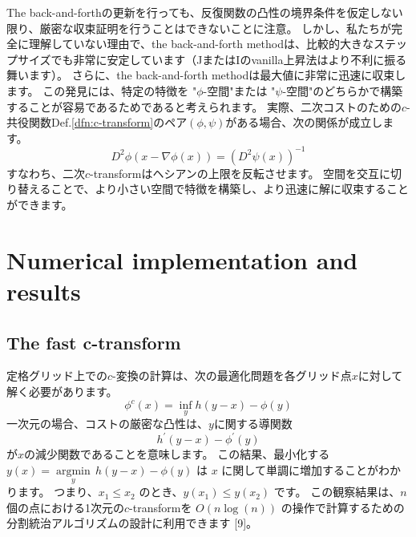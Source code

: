 \documentclass{jsarticle}
\theoremstyle{definition}
\begin{document}
\begin{comment}
  Proposition 2の簡単な証明を以下に示します。

  1. 全ての反復$\varphi_n$、$\varphi_{n+1/2}$、$\psi_n$、$\psi_{n+1/2}$が関数集合$S_{\lambda}=\{\varphi:(1-\lambda^{-1})I\leq D^2\varphi(x)\leq(1-\lambda)I\}$に属すると仮定します。
  2. 反復の定義を使用して、$\varphi_{n+1}$と$\psi_{n+1}$を$\varphi_n$、$\varphi_{n+1/2}$、$\psi_n$、$\psi_{n+1/2}$の式で表します。
  3. 関数集合$S_{\lambda}$に関する仮定を使用して、$\varphi_{n+1}$と$\varphi_{n+1/2}$の差、および$\psi_{n+1}$と$\psi_{n+1/2}$の差を境界します。
  4. 差の境界と二次コスト関数の性質を使用して、不等式$D(\varphi_{n+1},\psi_{n+1})\geq D(\varphi_{n+1/2},\psi_{n+1/2})\geq D(\varphi_n,\psi_n)$を導出します。
  5. 原始問題と双対問題の双方の関係性と二次コスト関数の性質を使用して、不等式$I(\psi_{n+1})\geq I(\psi_{n+1/2})\geq J(\varphi_{n+1/2})\geq J(\varphi_n)\geq I(\psi_n)$を導出します。

  注意：これは一般的な概要であり、実際の証明には追加の手順と技術的な詳細が必要な場合があります。
\end{comment}

\vspace\baselineskip 

The back-and-forthの更新を行っても、反復関数の凸性の境界条件を仮定しない限り、厳密な収束証明を行うことはできないことに注意。
しかし、私たちが完全に理解していない理由で、the back-and-forth methodは、比較的大きなステップサイズでも非常に安定しています（JまたはIのvanilla上昇法はより不利に振る舞います）。
さらに、the back-and-forth methodは最大値に非常に迅速に収束します。
この発見には、特定の特徴を "$\phi$-空間"または "$\psi$-空間"のどちらかで構築することが容易であるためであると考えられます。
実際、二次コストのための$c$-共役関数Def.\ref{dfn:c-transform}のペア$(\phi, \psi)$がある場合、次の関係が成立します。
$$
D^2 \phi(x - \nabla\phi(x)) = (D^2 \psi(x))^{-1}
$$
すなわち、二次$c$-transformはヘシアンの上限を反転させます。
空間を交互に切り替えることで、より小さい空間で特徴を構築し、より迅速に解に収束することができます。


\section{Numerical implementation and results}
\subsection{The fast c-transform}


定格グリッド上での$c$-変換の計算は、次の最適化問題を各グリッド点$x$に対して解く必要があります。
$$
\phi^c(x) = \inf_y h(y - x) - \phi(y)
$$
一次元の場合、コストの厳密な凸性は、$y$に関する導関数
$$
h^\prime(y - x) - \phi^\prime(y)
$$
が$x$の減少関数であることを意味します。
この結果、最小化する $y(x)=\underset{y}{\operatorname{argmin}} \, h(y-x) - \phi(y)$ は $x$ に関して単調に増加することがわかります。
つまり、$x_1 \leq x_2$ のとき、$y(x_1) \leq y(x_2)$ です。
この観察結果は、$n$個の点における1次元の$c$-transformを $O(n \log(n))$ の操作で計算するための分割統治アルゴリズムの設計に利用できます [9]。
\end{document}
